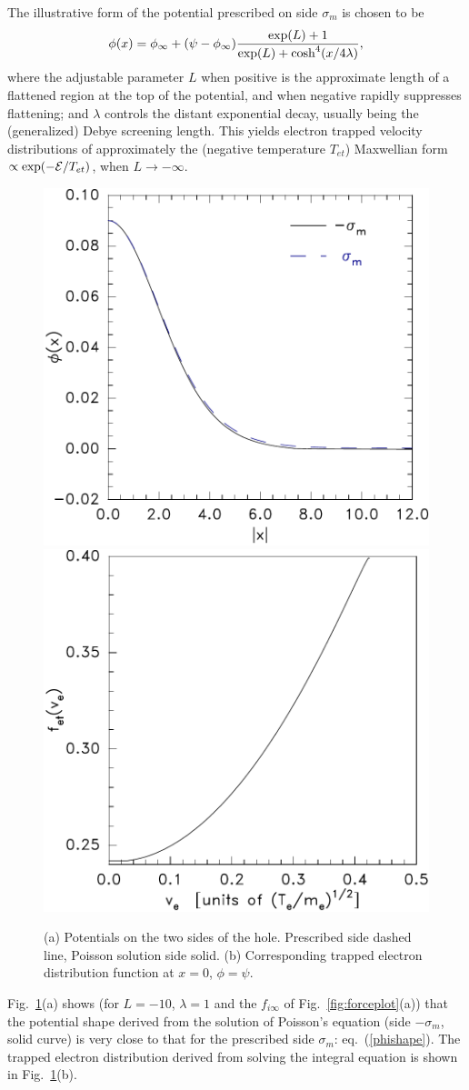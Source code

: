 \documentclass[pre]{revtex4-2}
\def\energy{{\cal E}}
\begin{document}
The illustrative form of the potential prescribed on side $\sigma_m$
is chosen to be
\begin{equation}\label{phishape}
  \phi(x)=\phi_\infty+(\psi-\phi_\infty){\exp(L)+1\over
  \exp(L)+\cosh^4(x/4\lambda)},
\end{equation}
where the adjustable parameter $L$ when positive is the approximate
length of a flattened region at the top of the potential, and when
negative rapidly suppresses flattening; and $\lambda$ controls the
distant exponential decay, usually being the (generalized) Debye
screening length. This yields electron trapped velocity distributions
of approximately the (negative temperature $T_{et}$) Maxwellian form
$\propto\exp(-\energy/T_{et})$, when $L\to-\infty$\cite{Hutchinson2017}.
\begin{figure}[htp]
  \includegraphics[width=0.48\hsize]{phiofmodx}
  \includegraphics[width=0.48\hsize]{ftrapped}
  \caption{(a) Potentials on the two sides of the hole. Prescribed
    side dashed line, Poisson solution side solid. (b) Corresponding trapped
    electron distribution function at $x=0$, $\phi=\psi$.}
  \label{fig:phiofmodx}
\end{figure}
Fig.\ \ref{fig:phiofmodx}(a) shows (for $L=-10$, $\lambda=1$ and the
$f_{i\infty}$ of Fig.\ \ref{fig:forceplot}(a)) that the potential
shape derived from the solution of Poisson's equation (side
$-\sigma_m$, solid curve) is very close to that for the prescribed
side $\sigma_m$: eq.\ (\ref{phishape}). The trapped electron
distribution derived from solving the integral equation is shown in
Fig.\ \ref{fig:phiofmodx}(b).
\end{document}
